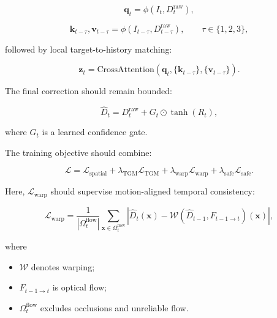 \documentclass[11pt,a4paper]{article}
\begin{document}
\begin{equation}
\mathbf{q}_t
=
\phi
\left(
I_t,
D_t^{\mathrm{raw}}
\right),
\end{equation}

\begin{equation}
\mathbf{k}_{t-\tau},
\mathbf{v}_{t-\tau}
=
\phi
\left(
I_{t-\tau},
D_{t-\tau}^{\mathrm{raw}}
\right),
\qquad
\tau \in \{1,2,3\},
\end{equation}

followed by local target-to-history matching:

\begin{equation}
\mathbf{z}_t
=
\mathrm{CrossAttention}
\left(
\mathbf{q}_t,
\{\mathbf{k}_{t-\tau}\},
\{\mathbf{v}_{t-\tau}\}
\right).
\end{equation}

The final correction should remain bounded:

\begin{equation}
\hat{D}_t
=
D_t^{\mathrm{raw}}
+
G_t
\odot
\tanh
\left(
R_t
\right),
\end{equation}

where $G_t$ is a learned confidence gate.

The training objective should combine:

\begin{equation}
\mathcal{L}
=
\mathcal{L}_{\mathrm{spatial}}
+
\lambda_{\mathrm{TGM}}
\mathcal{L}_{\mathrm{TGM}}
+
\lambda_{\mathrm{warp}}
\mathcal{L}_{\mathrm{warp}}
+
\lambda_{\mathrm{safe}}
\mathcal{L}_{\mathrm{safe}}.
\end{equation}

Here, $\mathcal{L}_{\mathrm{warp}}$ should supervise motion-aligned temporal
consistency:

\begin{equation}
\mathcal{L}_{\mathrm{warp}}
=
\frac{1}{|\Omega_t^{\mathrm{flow}}|}
\sum_{\mathbf{x}\in\Omega_t^{\mathrm{flow}}}
\left|
\hat{D}_t(\mathbf{x})
-
\mathcal{W}
\left(
\hat{D}_{t-1},
F_{t-1\rightarrow t}
\right)
(\mathbf{x})
\right|,
\end{equation}

where

\begin{itemize}[leftmargin=*]
    \item $\mathcal{W}$ denotes warping;
    \item $F_{t-1\rightarrow t}$ is optical flow;
    \item $\Omega_t^{\mathrm{flow}}$ excludes occlusions and unreliable flow.
\end{itemize}
\end{document}
